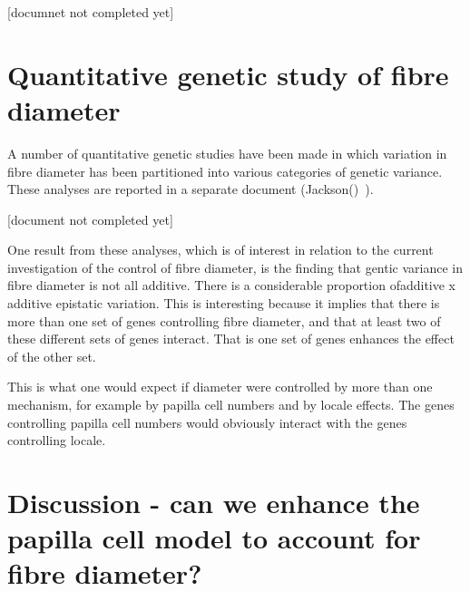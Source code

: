 \documentclass[titlepage]{article}  %
\begin{document}
[documnet not completed yet]


\section{Quantitative genetic study of fibre diameter}
A number of quantitative genetic studies have been made in which variation in fibre diameter has been partitioned into various categories of genetic variance.   These analyses are reported in a separate document (Jackson()~\cite{}).

[document not completed yet]

One result from these analyses, which is of interest in relation to the current investigation of the control of fibre diameter, is the finding that gentic variance in fibre diameter is not all additive. There is a considerable proportion ofadditive x additive epistatic variation. This is interesting because  it implies that there is more than one set of genes controlling fibre diameter, and that at least two of these different sets of genes interact. That is one set of genes enhances the effect of the other set.  

This is what one would expect if diameter were controlled by more than one mechanism, for example by papilla cell numbers and by locale effects. The genes controlling papilla cell numbers would obviously interact with the genes controlling locale.

\section{Discussion - can we enhance the papilla cell model to account for fibre diameter?}
\end{document}
